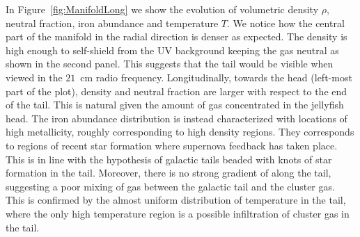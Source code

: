 In Figure~\ref{fig:ManifoldLong} we show the evolution of volumetric density $\rho$, neutral fraction, iron abundance \feh{} and temperature $T$.
We notice how the central part of the manifold in the radial direction is denser as expected.
The density is high enough to self-shield from the UV background keeping the gas neutral as shown in the second panel.
This suggests that the tail would be visible when viewed in the $21$~cm radio frequency.
Longitudinally, towards the head (left-most part of the plot), density and neutral fraction are larger with respect to the end of the tail.
This is natural given the amount of gas concentrated in the jellyfish head.
The iron abundance distribution is instead characterized with locations of high metallicity, roughly corresponding to high density regions.
They corresponds to regions of recent star formation where supernova feedback has taken place.
This is in line with the hypothesis of galactic tails beaded with knots of star formation in the tail.
Moreover, there is no strong gradient of \feh{} along the tail, suggesting a poor mixing of gas between the galactic tail and the cluster gas.
This is confirmed by the almost uniform distribution of temperature in the tail, where the only high temperature region is a possible infiltration of cluster gas in the tail.

